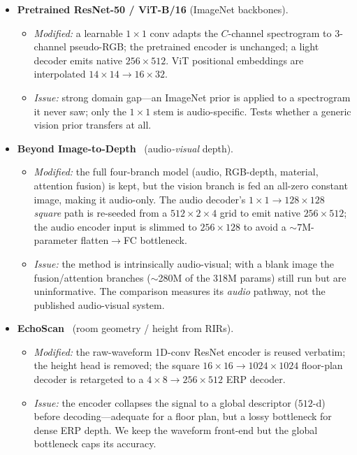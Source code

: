 \begin{itemize}\itemsep2pt
\item \textbf{Pretrained ResNet-50 / ViT-B/16} (ImageNet backbones).
  \begin{itemize}
    \item \emph{Modified:} a learnable $1{\times}1$ conv adapts the $C$-channel
      spectrogram to $3$-channel pseudo-RGB; the pretrained encoder is unchanged; a
      light decoder emits native $256\times512$. ViT positional embeddings are
      interpolated $14{\times}14\!\to\!16{\times}32$.
    \item \emph{Issue:} strong domain gap---an ImageNet prior is applied to a
      spectrogram it never saw; only the $1{\times}1$ stem is audio-specific. Tests
      whether a generic vision prior transfers at all.
  \end{itemize}

\item \textbf{Beyond Image-to-Depth}~\cite{parida2021beyond} (audio\emph{-visual} depth).
  \begin{itemize}
    \item \emph{Modified:} the full four-branch model (audio, RGB-depth, material,
      attention fusion) is kept, but the vision branch is fed an all-zero constant
      image, making it audio-only. The audio decoder's $1{\times}1{\to}128{\times}128$
      \emph{square} path is re-seeded from a $512{\times}2{\times}4$ grid to emit
      native $256\times512$; the audio encoder input is slimmed to $256{\times}128$
      to avoid a ${\sim}7$M-parameter flatten$\to$FC bottleneck.
    \item \emph{Issue:} the method is intrinsically audio-visual; with a blank image
      the fusion/attention branches ($\sim$280M of the 318M params) still run but are
      uninformative. The comparison measures its \emph{audio} pathway, not the
      published audio-visual system.
  \end{itemize}

\item \textbf{EchoScan}~\cite{yeon2024echoscan} (room geometry / height from RIRs).
  \begin{itemize}
    \item \emph{Modified:} the raw-waveform 1D-conv ResNet encoder is reused
      verbatim; the height head is removed; the square
      $16{\times}16{\to}1024{\times}1024$ floor-plan decoder is retargeted to a
      $4{\times}8{\to}256{\times}512$ ERP decoder.
    \item \emph{Issue:} the encoder collapses the signal to a global descriptor
      ($512$-d) before decoding---adequate for a floor plan, but a lossy bottleneck
      for dense ERP depth. We keep the waveform front-end but the global bottleneck
      caps its accuracy.
  \end{itemize}


\end{itemize}

